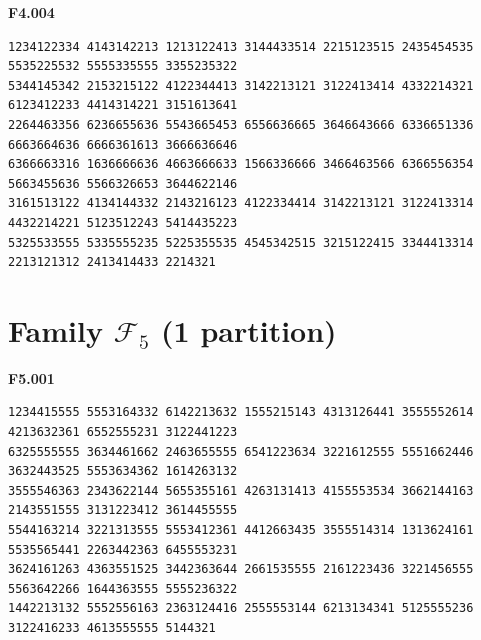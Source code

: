 \noindent\begin{minipage}{\linewidth}\textbf{F4.004}
\begin{lstlisting}
1234122334 4143142213 1213122413 3144433514 2215123515 2435454535 5535225532 5555335555 3355235322
5344145342 2153215122 4122344413 3142213121 3122413414 4332214321 6123412233 4414314221 3151613641
2264463356 6236655636 5543665453 6556636665 3646643666 6336651336 6663664636 6666361613 3666636646
6366663316 1636666636 4663666633 1566336666 3466463566 6366556354 5663455636 5566326653 3644622146
3161513122 4134144332 2143216123 4122334414 3142213121 3122413314 4432214221 5123512243 5414435223
5325533555 5335555235 5225355535 4545342515 3215122415 3344413314 2213121312 2413414433 2214321
\end{lstlisting}
\end{minipage}\par\smallskip

\section*{\texorpdfstring{Family $\mathcal F_5$ (1 partition)}{Family F5 (1)}}

\noindent\begin{minipage}{\linewidth}\textbf{F5.001}
\begin{lstlisting}
1234415555 5553164332 6142213632 1555215143 4313126441 3555552614 4213632361 6552555231 3122441223
6325555555 3634461662 2463655555 6541223634 3221612555 5551662446 3632443525 5553634362 1614263132
3555546363 2343622144 5655355161 4263131413 4155553534 3662144163 2143551555 3131223412 3614455555
5544163214 3221313555 5553412361 4412663435 3555514314 1313624161 5535565441 2263442363 6455553231
3624161263 4363551525 3442363644 2661535555 2161223436 3221456555 5563642266 1644363555 5555236322
1442213132 5552556163 2363124416 2555553144 6213134341 5125555236 3122416233 4613555555 5144321
\end{lstlisting}
\end{minipage}\par\smallskip
